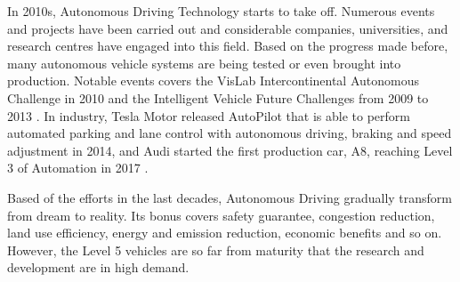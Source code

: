 In 2010s,  Autonomous Driving Technology starts to take off. Numerous events and projects have been carried out and considerable companies, universities, and research centres have engaged into this field. Based on the progress made before, many autonomous vehicle systems are being tested or even brought into production.  Notable events covers the VisLab Intercontinental Autonomous Challenge in 2010 \cite{doi:10.1504/IJVAS.2012.051250} and the Intelligent Vehicle Future  Challenges from 2009 to 2013 \cite{newlet00}. In industry, Tesla Motor released AutoPilot  that is able to perform automated parking and lane control with autonomous driving, braking and speed adjustment in 2014, and  Audi started the first production car, A8,  reaching Level 3 of Automation in 2017 \cite{historyad}.

Based of the efforts in the last decades, Autonomous Driving  gradually transform from dream to reality. Its bonus covers safety guarantee, congestion reduction, land use efficiency, energy and emission reduction, economic benefits and so on. However, the Level 5 vehicles are so far from maturity that the research and development are in high demand.
